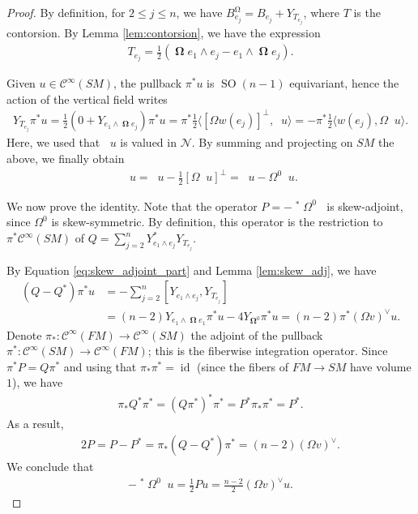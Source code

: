 \documentclass[10pt,a4paper]{amsart}
\DeclareMathOperator{\SO}{SO}
\DeclareMathOperator{\identity}{id}
\DeclareMathOperator{\mg}{\Omega}
\DeclareMathOperator{\nh}{\nabla_{\mathbb{H}}}
\DeclareMathOperator{\nhs}{\nabla_{\mathbb{H}^{\mg}}}
\DeclareMathOperator{\nv}{\nabla_{\mathbb{V}}}
\DeclareMathOperator{\oo}{\mathbf{\Omega}}
\begin{document}
\begin{proof}
By definition, for $2 \leq j \leq n$, we have $B^{\mg}_{e_j} = B_{e_j} + Y_{T_{e_j}}$, where $T$ is the contorsion. By Lemma \ref{lem:contorsion}, we have the expression 
\begin{align*}
T_{e_j} = \frac{1}{2} (\oo e_1 \wedge e_j - e_1 \wedge \oo e_j).
\end{align*}

Given $u \in \mathcal{C}^\infty(SM)$, the pullback $\pi^* u$ is $\SO(n-1)$ equivariant, hence the action of the vertical field writes 
\begin{align*}
Y_{T_{e_j}} \pi^* u 
= \frac{1}{2} (0 + Y_{e_1 \wedge \oo e_j}) \pi^* u = \pi^* \frac{1}{2} \langle [\Omega w(e_j)]^\perp, \nv u \rangle = - \pi^* \frac{1}{2} \langle w(e_j), \Omega \nv u \rangle.
\end{align*}
Here, we used that $\nv u$ is valued in $\mathcal{N}$. By summing and projecting on $SM$ the above, we finally obtain 
\begin{align*}
\nhs u = \nh u - \frac{1}{2} [\Omega \nv u]^\perp = \nh u - \Omega^0 \nv u.
\end{align*}

We now prove the identity. Note that the operator $P = - \nv^* \Omega^0 \nv$ is skew-adjoint, since $\Omega^0$ is skew-symmetric. By definition, this operator is the restriction to $\pi^* \mathcal{C}^\infty(SM)$ of $Q = \sum_{j=2}^n Y_{e_1 \wedge e_j}^* Y_{T_{e_j}}$. 

By Equation \eqref{eq:skew_adjoint_part} and Lemma \ref{lem:skew_adj}, we have 
\begin{align*}
(Q - Q^*) \pi^* u &= - \sum_{j=2}^n [Y_{e_1 \wedge e_j}, Y_{T_{e_j}}] \\ 
&= (n-2) Y_{e_1 \wedge \oo e_1} \pi^* u - 4 Y_{\oo^0} \pi^* u = (n-2) \pi^* (\Omega v)^\vee u.
\end{align*}
Denote $\pi_*: \mathcal{C}^\infty(FM) \to \mathcal{C}^\infty(SM)$ the adjoint of the pullback $\pi^*: \mathcal{C}^\infty(SM) \to \mathcal{C}^\infty(FM)$; this is the fiberwise integration operator. Since $\pi^* P = Q \pi^*$ and using that $\pi_* \pi^* = \identity$ (since the fibers of $FM \to SM$ have volume $1$), we have 
\begin{align*}
\pi_* Q^* \pi^* = (Q \pi^*)^* \pi^* = P^* \pi_* \pi^* = P^*.
\end{align*}
As a result, 
\begin{align*}
2P = P - P^* = \pi_* (Q - Q^*) \pi^* = (n-2) (\Omega v)^\vee.
\end{align*}
We conclude that 
\begin{align*}
- \nv^* \Omega^0 \nv u = \frac{1}{2} P u = \frac{n-2}{2} (\Omega v)^\vee u.
\end{align*}
\end{proof}
\end{document}
